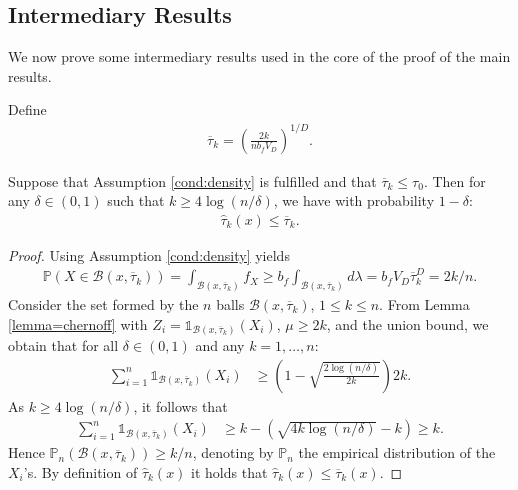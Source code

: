 \subsection*{Intermediary Results}
We now prove some intermediary results used in the core of the proof of the main results.

Define
\begin{align*}
\overline{\tau}_{k}  = \left(\frac{ 2  k }{ n b_fV_D}  \right)^{1/ D}.
\end{align*}

\begin{proposition}\label{prop:tau}
Suppose that Assumption \ref{cond:density} is fulfilled and that $\overline \tau_{k} \leq \tau_0$. Then for any $\delta \in (0,1)$ such that  $ k\geq 4   \log(n/\delta)   $, we have with probability $1-\delta$:
\begin{align*}
 \hat \tau_k(x)   \leq \overline \tau _k .
\end{align*}
\end{proposition}

\begin{proof}
 Using Assumption \ref{cond:density} yields
\begin{align*}
\mathbb P (X\in \mathcal{B} (x, \overline \tau_{k} ) )  =   \int_{\mathcal{B} (x, \overline \tau_{k}  )} f_X  \geq b_f \int _{\mathcal{B} (x, \overline \tau_{k}  ) } d\lambda = b_fV_{D} \overline \tau_{k} ^{  D}  = 2k/n.
\end{align*}
Consider the set formed by the $n$ balls $ \mathcal{B} (x, \overline \tau_{k}   ) $, $  1\leq k\leq n $. From Lemma \ref{lemma=chernoff} with $Z_i = \mathds 1 _{ \mathcal{B} (x, \overline \tau_{k}  )} (X_i )$, $\mu \geq 2k$, and the union bound, we obtain that for all $\delta\in (0,1)$ and any $k= 1,\ldots, n$:
\begin{align*}
\sum_{i=1} ^n \mathds 1 _{ \mathcal{B} (x, \overline \tau_{k}  ) } (X_i ) &\geq \left(1- \sqrt{ \frac{2 \log(n/\delta)  }{ 2k} } \right) 2k  .
\end{align*}
As $ k\geq 4   \log(n/\delta)  $, it follows that
\begin{align*}
\sum_{i=1} ^n \mathds 1 _{ \mathcal{B} (x, \overline \tau_{k}  ) } (X_i ) & \geq k - (  \sqrt{ 4 k  \log(n/\delta)} -  k)\geq k.
\end{align*}
Hence $ \mathbb P_n ( \mathcal{B} (x, \overline \tau_{k} ) ) \geq k / n $, denoting by $\mathbb P_n $ the empirical distribution of the $X_i$'s. By definition of $\hat \tau _{k}(x)$ it holds that  $\hat \tau _{k}(x) \leq  \overline \tau _{k}(x)$.
\end{proof}

